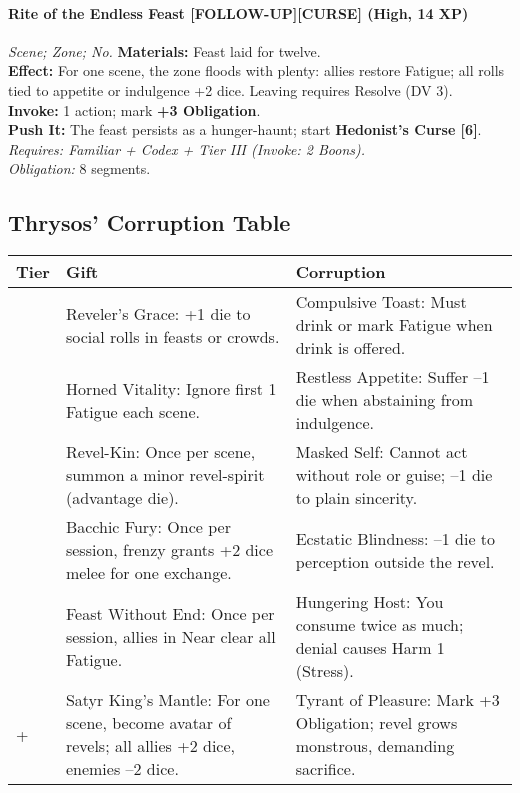\paragraph*{Rite of the Endless Feast [FOLLOW-UP][CURSE] (High, 14 XP)} \emph{Scene; Zone; No.}
\textbf{Materials:} Feast laid for twelve.\\
\textbf{Effect:} For one scene, the zone floods with plenty: allies restore Fatigue; all rolls tied to appetite or indulgence +2 dice. Leaving requires Resolve (DV 3).\\
\textbf{Invoke:} 1 action; mark \textbf{+3 Obligation}.\\
\textbf{Push It:} The feast persists as a hunger-haunt; start \textbf{Hedonist’s Curse [6]}.\\
\emph{Requires: Familiar + Codex + Tier III (\textit{Invoke:} 2 Boons).}\\
\emph{Obligation:} 8 segments.

\subsection*{Thrysos’ Corruption Table}
\label{sec:thrysos-corruption}

\begin{longtable}{>{\raggedright\arraybackslash}p{1cm} p{5cm} p{5cm}}
\toprule
\textbf{Tier} & \textbf{Gift} & \textbf{Corruption} \\
\midrule
1 & Reveler’s Grace: +1 die to social rolls in feasts or crowds. & Compulsive Toast: Must drink or mark Fatigue when drink is offered. \\
\midrule
2 & Horned Vitality: Ignore first 1 Fatigue each scene. & Restless Appetite: Suffer --1 die when abstaining from indulgence. \\
\midrule
3 & Revel-Kin: Once per scene, summon a minor revel-spirit (advantage die). & Masked Self: Cannot act without role or guise; --1 die to plain sincerity. \\
\midrule
4 & Bacchic Fury: Once per session, frenzy grants +2 dice melee for one exchange. & Ecstatic Blindness: --1 die to perception outside the revel. \\
\midrule
5 & Feast Without End: Once per session, allies in Near clear all Fatigue. & Hungering Host: You consume twice as much; denial causes Harm 1 (Stress). \\
\midrule
6+ & Satyr King’s Mantle: For one scene, become avatar of revels; all allies +2 dice, enemies --2 dice. & Tyrant of Pleasure: Mark +3 Obligation; revel grows monstrous, demanding sacrifice. \\
\bottomrule
\end{longtable}